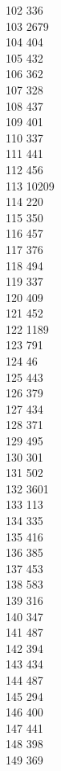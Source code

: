 { 102	336 \\
 103	2679 \\
 104	404 \\
 105	432 \\
 106	362 \\
 107	328 \\
 108	437 \\
 109	401 \\
 110	337 \\
 111	441 \\
 112	456 \\
 113	10209 \\
 114	220 \\
 115	350 \\
 116	457 \\
 117	376 \\
 118	494 \\
 119	337 \\
 120	409 \\
 121	452 \\
 122	1189 \\
 123	791 \\
 124	46 \\
 125	443 \\
 126	379 \\
 127	434 \\
 128	371 \\
 129	495 \\
 130	301 \\
 131	502 \\
 132	3601 \\
 133	113 \\
 134	335 \\
 135	416 \\
 136	385 \\
 137	453 \\
 138	583 \\
 139	316 \\
 140	347 \\
 141	487 \\
 142	394 \\
 143	434 \\
 144	487 \\
 145	294 \\
 146	400 \\
 147	441 \\
 148	398 \\
 149	369 \\
}
